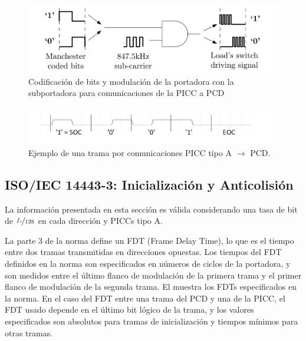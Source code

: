 \documentclass[a4paper, twoside, 11pt]{report}
\begin{document}
\begin{figure}[htb]
  \centering
  \includegraphics[scale=0.35]{./img/picc_to_pcd}
  \caption{Codificación de bits y modulación de la portadora con la subportadora para comunicaciones de la PICC a PCD~\cite{fabricio_eamta}}
  \label{fig:picc_to_pcd}
\end{figure}

\begin{figure}[htb]
  \centering
  \includegraphics[scale=0.5]{./img/tx_frame_example}
  \caption{Ejemplo de una trama por comunicaciones PICC tipo A $\rightarrow$ PCD.}
  \label{fig:tx_frame_example}
\end{figure}

\FloatBarrier
\subsection{ISO/IEC 14443-3: \large{Inicialización y Anticolisión}}
\label{sec:introduction_iso14443-3}

La información presentada en esta sección es válida considerando una tasa de bit de $\nicefrac{f_c}{128}$ en cada dirección y PICCs tipo A.

La parte 3 de la norma define un FDT (Frame Delay Time), lo que es el tiempo entre dos tramas transmitidas en direcciones opuestas. Los tiempos del FDT definidos en la norma son especificados en números de ciclos de la portadora, y son medidos entre el último flanco de modulación de la primera trama y el primer flanco de modulación de la segunda trama. El  muestra los FDTs especificados en la norma. En el caso del FDT entre una trama del PCD y una de la PICC, el FDT usado depende en el último bit lógico de la trama, y los valores especificados son absolutos para tramas de inicialización y tiempos mínimos para otras tramas.
\end{document}
